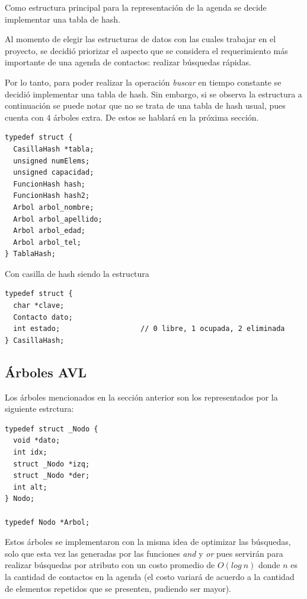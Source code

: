 \documentclass[11pt]{article}
\begin{document}
Como estructura principal para la representaci\'on de la agenda se decide implementar una tabla de hash.

Al momento de elegir las estructuras de datos con las cuales trabajar en el proyecto, se decidi\'o priorizar el aspecto que se considera 
el requerimiento m\'as importante de una agenda de contactos: realizar b\'usquedas r\'apidas. 

Por lo tanto, para poder realizar la operaci\'on \emph{buscar} en tiempo constante se decidi\'o implementar una tabla de hash. 
Sin embargo, si se observa la estructura a continuaci\'on se puede notar que no se trata de una tabla de hash usual, pues 
cuenta con 4 \'arboles extra. De estos se hablar\'a en la pr\'oxima secci\'on.

\begin{lstlisting}[style = CStyle]
typedef struct {
  CasillaHash *tabla;
  unsigned numElems;
  unsigned capacidad;
  FuncionHash hash;
  FuncionHash hash2;
  Arbol arbol_nombre;
  Arbol arbol_apellido;
  Arbol arbol_edad;
  Arbol arbol_tel;
} TablaHash;
\end{lstlisting}

Con casilla de hash siendo la estructura 

\begin{lstlisting}[style = CStyle]
  typedef struct {
  char *clave;
  Contacto dato;
  int estado;                   // 0 libre, 1 ocupada, 2 eliminada
} CasillaHash;
\end{lstlisting}

\vspace{1cm}

\subsection{Árboles AVL}

Los \'arboles mencionados en la secci\'on anterior son los representados por la siguiente estrctura: 

\begin{lstlisting}[style = CStyle]
typedef struct _Nodo {
  void *dato;
  int idx;
  struct _Nodo *izq;
  struct _Nodo *der;
  int alt;
} Nodo;

typedef Nodo *Arbol;
\end{lstlisting}

Estos \'arboles se implementaron con la misma idea de optimizar las b\'usquedas, solo que esta vez las generadas por las funciones \emph{and} y \emph{or} pues servir\'an para realizar
b\'usquedas por atributo con un costo promedio de $O(log\ n)$ donde $n$ es la cantidad de contactos en la agenda (el costo variar\'a de acuerdo a la cantidad de elementos repetidos que se presenten, pudiendo ser mayor).
\end{document}
